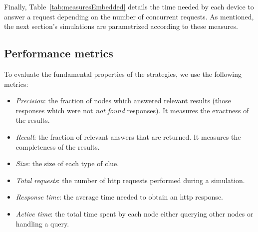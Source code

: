 Finally, Table~\ref{tab:measuresEmbedded} details the time needed by each device to answer a request depending on the number of concurrent requests.
As mentioned, the next section's simulations are parametrized according to these measures.






\subsection{Performance metrics}
To evaluate the fundamental properties of the strategies, we use the following metrics:
\begin{itemize}
  \item \textit{Precision}: the fraction of nodes which answered relevant results (those responses which were not \textit{not found} responses).
                            It measures the exactness of the results.
  \item \textit{Recall}: the fraction of relevant answers that are returned.
                         It measures the completeness of the results.%
  \item \textit{Size}: the size of each type of clue.
  \item \textit{Total requests}: the number of \acs{http} requests performed during a simulation.
  \item \textit{Response time}: the average time needed to obtain an \acs{http} response.
  \item \textit{Active time}: the total time spent by each node either querying other nodes or handling a query.
\end{itemize}